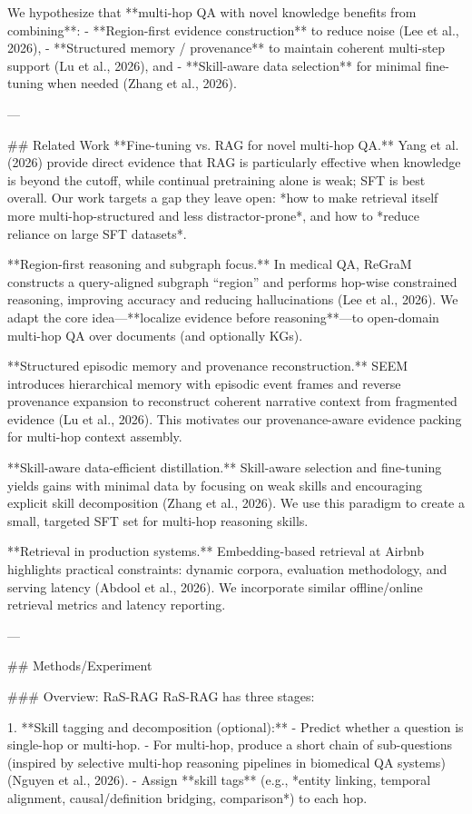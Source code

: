 We hypothesize that **multi-hop QA with novel knowledge benefits from combining**:  
- **Region-first evidence construction** to reduce noise (Lee et al., 2026),  
- **Structured memory / provenance** to maintain coherent multi-step support (Lu et al., 2026), and  
- **Skill-aware data selection** for minimal fine-tuning when needed (Zhang et al., 2026).  

---

## Related Work  
**Fine-tuning vs. RAG for novel multi-hop QA.** Yang et al. (2026) provide direct evidence that RAG is particularly effective when knowledge is beyond the cutoff, while continual pretraining alone is weak; SFT is best overall. Our work targets a gap they leave open: *how to make retrieval itself more multi-hop-structured and less distractor-prone*, and how to *reduce reliance on large SFT datasets*.  

**Region-first reasoning and subgraph focus.** In medical QA, ReGraM constructs a query-aligned subgraph “region” and performs hop-wise constrained reasoning, improving accuracy and reducing hallucinations (Lee et al., 2026). We adapt the core idea—**localize evidence before reasoning**—to open-domain multi-hop QA over documents (and optionally KGs).  

**Structured episodic memory and provenance reconstruction.** SEEM introduces hierarchical memory with episodic event frames and reverse provenance expansion to reconstruct coherent narrative context from fragmented evidence (Lu et al., 2026). This motivates our provenance-aware evidence packing for multi-hop context assembly.  

**Skill-aware data-efficient distillation.** Skill-aware selection and fine-tuning yields gains with minimal data by focusing on weak skills and encouraging explicit skill decomposition (Zhang et al., 2026). We use this paradigm to create a small, targeted SFT set for multi-hop reasoning skills.  

**Retrieval in production systems.** Embedding-based retrieval at Airbnb highlights practical constraints: dynamic corpora, evaluation methodology, and serving latency (Abdool et al., 2026). We incorporate similar offline/online retrieval metrics and latency reporting.  

---

## Methods/Experiment  

### Overview: RaS-RAG  
RaS-RAG has three stages:

1. **Skill tagging and decomposition (optional):**  
   - Predict whether a question is single-hop or multi-hop.  
   - For multi-hop, produce a short chain of sub-questions (inspired by selective multi-hop reasoning pipelines in biomedical QA systems) (Nguyen et al., 2026).  
   - Assign **skill tags** (e.g., *entity linking, temporal alignment, causal/definition bridging, comparison*) to each hop.

